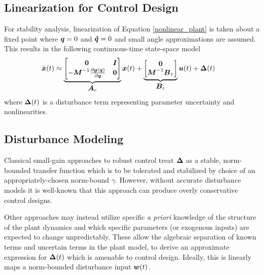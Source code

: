 \subsection{Linearization for Control Design}
For stability analysis, linearization of Equation \eqref{nonlinear_plant} is taken about a fixed point where $\vb*{q} = 0$ and $\vb*{\dot{q}} = 0$ and small angle approximations are assumed.  This results in the following continuous-time state-space model
\begin{equation}
\label{fixed_point_linearization1}
\begin{aligned}
	\dot{\vb*{x}}(t) &\approx
	\underbrace{
	\begin{bmatrix}
		\vb*{0} & \vb*{I}\\
		-\vb*{M}^{-1} \frac{\partial \vb*{g}(\vb*{q})}{\partial \vb*{q}} & \vb*{0}\\
	\end{bmatrix}}_{\text{\normalsize $\vb*{A}_{c}$}}
	\vb*{x}(t)
	 + 
	\underbrace{
	\begin{bmatrix}
		\vb*{0}\\
		\vb*{M}^{-1}\vb*{B}_{\tau}\\
	\end{bmatrix}}_{\text{\normalsize $\vb*{B}_{c}$}}
	\vb*{u}(t)
	 + 
	 \vb*{\Delta}(t)
\end{aligned}
\end{equation}
where $\vb*{\Delta}(t)$ is a disturbance term representing parameter uncertainty and nonlinearities.

\subsection{Disturbance Modeling}
\label{sect:disturbance_modeling}
Classical small-gain approaches to robust control treat $\vb*{\Delta}$ as a stable, norm-bounded transfer function which is to be tolerated and stabilized by choice of an appropriately-chosen norm-bound $\gamma$.  However, without accurate disturbance models it is well-known that this approach can produce overly conservative control designs.

Other approaches may instead utilize specific \emph{a priori} knowledge of the structure of the plant dynamics and which specific parameters (or exogenous inputs) are expected to change unpredictably.  These allow the algebraic separation of known terms and uncertain terms in the plant model, to derive an approximate expression for $\vb*{\Delta}(t)$ which is amenable to control design.  Ideally, this is linearly maps a norm-bounded disturbance input $\vb*{w}(t)$.

